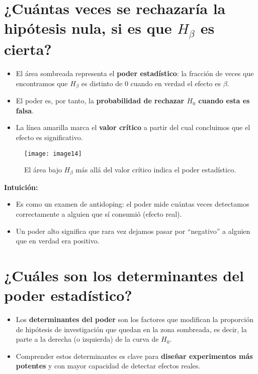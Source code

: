 \documentclass[12pt]{article}
\begin{document}
\section*{\noindent\textbf{¿Cuántas veces se rechazaría la hipótesis nula, si es que $H_\beta$ es cierta?}}

\begin{itemize}
    \item El área sombreada representa el \textbf{poder estadístico}: la fracción de veces que encontramos que $H_\beta$ es distinto de 0 cuando en verdad el efecto es $\beta$.
    \item El poder es, por tanto, la \textbf{probabilidad de rechazar $H_0$ cuando esta es falsa}.
    \item La línea amarilla marca el \textbf{valor crítico} a partir del cual concluimos que el efecto es significativo.
\end{itemize}

\begin{figure}[H]
    \centering
    \texttt{[image: image14]}
    \caption{\footnotesize El área bajo $H_\beta$ más allá del valor crítico indica el poder estadístico.}
\end{figure}

\textbf{Intuición:}
\begin{itemize}
    \item Es como un examen de antidoping: el poder mide cuántas veces detectamos correctamente a alguien que sí consumió (efecto real).
    \item Un poder alto significa que rara vez dejamos pasar por “negativo” a alguien que en verdad era positivo.
\end{itemize}


\section*{\noindent\textbf{¿Cuáles son los determinantes del poder estadístico?}}

\begin{itemize}
    \item Los \textbf{determinantes del poder} son los factores que modifican la proporción de hipótesis de investigación que quedan en la zona sombreada, es decir, la parte a la derecha (o izquierda) de la curva de $H_0$.
    \item Comprender estos determinantes es clave para \textbf{diseñar experimentos más potentes} y con mayor capacidad de detectar efectos reales.
\end{itemize}
\end{document}

